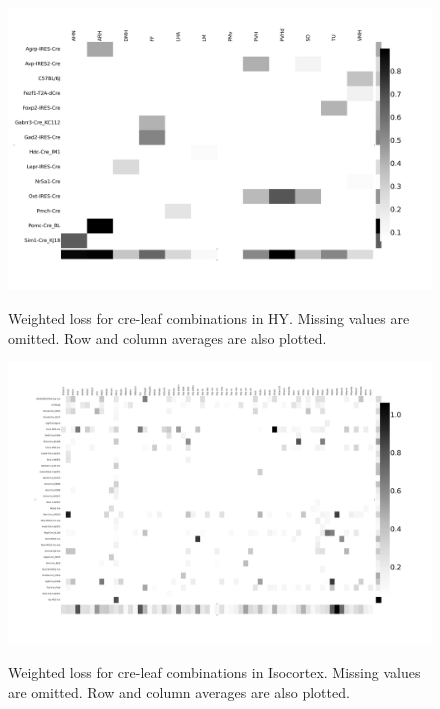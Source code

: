\begin{figure}[H]
    \centering
    \includegraphics[width = 7in]{figs/lossdetails_1097.png} 
    \label{fig:distances}
    \caption{Weighted loss for cre-leaf combinations in HY. Missing values are omitted.   Row and column averages are also plotted.}
\end{figure}

\begin{figure}[H]
    \centering
    \includegraphics[width = 7in]{figs/lossdetails_315.png} 
    \label{fig:distances}
    \caption{Weighted loss for cre-leaf combinations in Isocortex. Missing values are omitted.  Row and column averages are also plotted.}
\end{figure}


